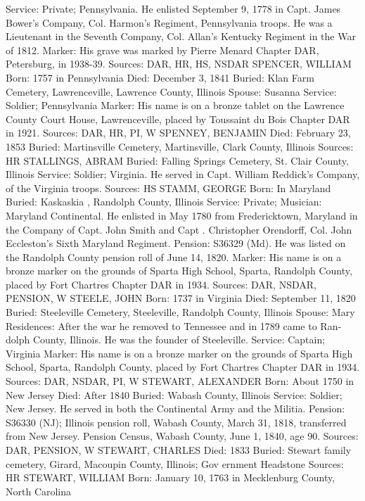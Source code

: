 Service: Private; Pennsylvania. He enlisted September 9, 1778 in Capt. James Bower's Company, Col. Harmon's Regiment, Pennsylvania troops. He was a Lieutenant in the Seventh Company, Col. Allan's Kentucky Regiment in the War of 1812. 
Marker: His grave was marked by Pierre Menard Chapter DAR, Petersburg, in 1938-39.
Sources: DAR, HR, HS, NSDAR 
SPENCER, WILLIAM
Born: 1757 in Pennsylvania
Died: December 3, 1841
Buried: Klan Farm Cemetery, Lawrenceville, Lawrence County, Illinois 
Spouse: Susanna 
Service: Soldier; Pennsylvania
Marker: His name is on a bronze tablet on the Lawrence County Court House, Lawrenceville, placed by Toussaint du Bois Chapter DAR in 1921.
Sources: DAR, HR, PI, W 
SPENNEY, BENJAMIN
Died: February 23, 1853
Buried: Martinsville Cemetery, Martinsville, Clark County, Illinois
Sources: HR 
STALLINGS, ABRAM
Buried: Falling Springs Cemetery, St. Clair County, Illinois
Service: Soldier; Virginia. He served in Capt. William Reddick's Company, of the Virginia troops.
Sources: HS 
STAMM, GEORGE
Born: In Maryland
Buried: Kaskaskia , Randolph County, Illinois
Service: Private; Musician: Maryland Continental. He enlisted in May 1780 from Fredericktown, Maryland in the Company of Capt. John Smith and Capt . Christopher Orendorff, Col. John Eccleston's Sixth Maryland Regiment.
Pension: S36329 (Md). He was listed on the Randolph County pension roll of June 14, 1820.
Marker: His name is on a bronze marker on the grounds of Sparta High School, Sparta, Randolph County, placed by Fort Chartres Chapter DAR in 1934.
Sources: DAR, NSDAR, PENSION, W 
STEELE, JOHN
Born: 1737 in Virginia
Died: September 11, 1820 
Buried: Steeleville Cemetery, Steeleville, Randolph County, Illinois
Spouse:  Mary Residences: After the war he removed to Tennessee and in 1789 came to Ran­dolph County, Illinois. He was the founder of Steeleville.
Service: Captain; Virginia
Marker: His name is on a bronze marker on the grounds of Sparta High School, Sparta, Randolph County, placed by Fort Chartres Chapter DAR in 1934.
Sources: DAR, NSDAR, PI, W 
STEWART, ALEXANDER
Born: About 1750 in New Jersey
Died: After 1840
Buried: Wabash County, Illinois
Service: Soldier; New Jersey. He served in both the Continental Army and the Militia.
Pension: S36330 (NJ); Illinois pension roll, Wabash County, March 31, 1818, transferred from New Jersey. Pension Census, Wabash County, June 1, 1840, age 90.
Sources: DAR, PENSION, W 
STEWART, CHARLES
Died: 1833
Buried: Stewart family cemetery, Girard, Macoupin County, Illinois; Gov ernment Headstone
Sources: HR 
STEWART, WILLIAM 
Born: January 10, 1763 in Mecklenburg County, North Carolina 
